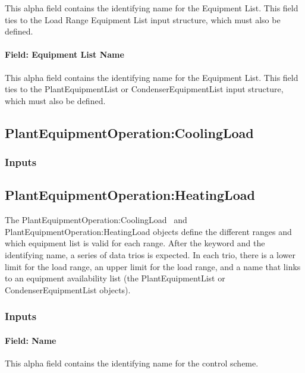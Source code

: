 This alpha field contains the identifying name for the Equipment List. This field ties to the Load Range Equipment List input structure, which must also be defined.

\paragraph{Field: Equipment List Name}\label{field-equipment-list-name-1}

This alpha field contains the identifying name for the Equipment List. This field ties to the PlantEquipmentList or CondenserEquipmentList input structure, which must also be defined.

\subsection{PlantEquipmentOperation:CoolingLoad}\label{plantequipmentoperationcoolingload}

\subsubsection{Inputs}\label{inputs-3-025}

\subsection{PlantEquipmentOperation:HeatingLoad}\label{plantequipmentoperationheatingload}

The PlantEquipmentOperation:CoolingLoad ~and PlantEquipmentOperation:HeatingLoad objects define the different ranges and which equipment list is valid for each range. After the keyword and the identifying name, a series of data trios is expected. In each trio, there is a lower limit for the load range, an upper limit for the load range, and a name that links to an equipment availability list (the PlantEquipmentList or CondenserEquipmentList objects).

\subsubsection{Inputs}\label{inputs-4-022}

\paragraph{Field: Name}\label{field-name-3-022}

This alpha field contains the identifying name for the control scheme.

